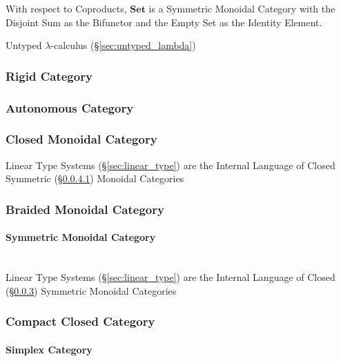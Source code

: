 With respect to Coproducts, $\mathbf{Set}$ is a Symmetric Monoidal
Category with the Disjoint Sum as the Bifunctor and the Empty
Set as the Identity Element.

Untyped $\lambda$-calculus (\S\ref{sec:untyped_lambda})



\subsubsection{Rigid Category}\label{sec:rigid_category}

\subsubsection{Autonomous Category}\label{sec:autonomous_category}

\subsubsection{Closed Monoidal Category}\label{sec:closed_monoidal}

Linear Type Systems (\S\ref{sec:linear_type}) are the Internal
Language of Closed Symmetric (\S\ref{sec:symmetric_monoidal}) Monoidal
Categories



\subsubsection{Braided Monoidal Category}\label{sec:braided_monoidal}

\paragraph{Symmetric Monoidal Category}\label{sec:symmetric_monoidal}
\hfill \\

Linear Type Systems (\S\ref{sec:linear_type}) are the Internal
Language of Closed (\S\ref{sec:closed_monoidal}) Symmetric Monoidal
Categories



\subsubsection{Compact Closed Category}\label{sec:compact_closed}

\paragraph{Simplex Category}\label{sec:simplex_category}

